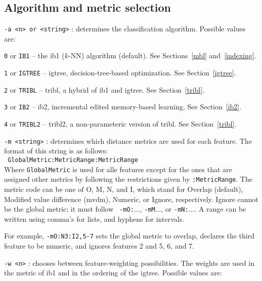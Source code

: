 \documentclass{report}
\begin{document}
\subsection{Algorithm and metric selection}

\begin{description}

\item {\tt -a <n> or <string>} : determines the classification
algorithm. Possible values are:

	\begin{description}
	\item {\tt 0} or {\tt IB1} -- the {\sc ib1} ($k$-NN) algorithm (default). See Sections~\ref{mbl} and~\ref{indexing}.
	\item {\tt 1} or {\tt IGTREE} -- {\sc igtree}, decision-tree-based optimization. See Section~\ref{igtree}.
	\item {\tt 2} or {\tt TRIBL} -- {\sc tribl}, a hybrid of {\sc ib1} and {\sc igtree}. See Section~\ref{tribl}.
	\item {\tt 3} or {\tt IB2} -- {\sc ib2}, incremental edited memory-based learning. See Section~\ref{ib2}.
	\item {\tt 4} or {\tt TRIBL2} -- {\sc tribl2}, a non-parameteric version of {\sc tribl}. See Section~\ref{tribl}.
	\end{description}

\item {\tt -m <string>} : determines which distance metrics are used
for each feature. The format of this string is as follows:\\ {\tt
GlobalMetric:MetricRange:MetricRange}\\ Where {\tt GlobalMetric} is
used for alle features except for the ones that are assigned other
metrics by following the restrictions given by {\tt :MetricRange}. The
metric code can be one of O, M, N, and I, which stand for Overlap
(default), Modified value difference ({\sc mvdm}), Numeric, or Ignore,
respectively. Ignore cannot be the global metric; it must follow {\tt
-mO:}$\ldots$, {\tt -mM}$\ldots$, or {\tt -mN:}$\ldots$. A range can
be written using comma's for lists, and hyphens for intervals.

For example, {\tt -mO:N3:I2,5-7} sets the global metric to overlap,
declares the third feature to be numeric, and ignores features 2 and
5, 6, and 7.

\item {\tt -w <n>} : chooses between feature-weighting possibilities.
The weights are used in the metric of {\sc ib1} and in the ordering of the
{\sc igtree}. Possible values are:


\end{description}
\end{document}
